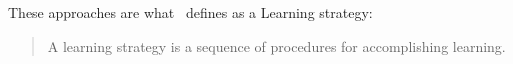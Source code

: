 \documentclass[../Master.tex]{subfiles}
\begin{document}
% 	
%
% 		
% 		
% 		
% 		
	
	
	These approaches are what~\cite{tobias1990a} defines as a Learning strategy:
	
\begin{quote}
	A learning strategy is a sequence of procedures for accomplishing learning.
\end{quote}
	
\end{document}
